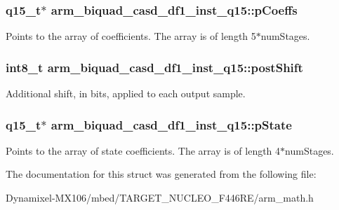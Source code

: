 \subsubsection[{\texorpdfstring{p\+Coeffs}{pCoeffs}}]{\setlength{\rightskip}{0pt plus 5cm}q15\+\_\+t$\ast$ arm\+\_\+biquad\+\_\+casd\+\_\+df1\+\_\+inst\+\_\+q15\+::p\+Coeffs}\hypertarget{structarm__biquad__casd__df1__inst__q15_a1edaacdebb5b09d7635bf20c779855fc}{}\label{structarm__biquad__casd__df1__inst__q15_a1edaacdebb5b09d7635bf20c779855fc}
Points to the array of coefficients. The array is of length 5$\ast$num\+Stages. 
\subsubsection[{\texorpdfstring{post\+Shift}{postShift}}]{\setlength{\rightskip}{0pt plus 5cm}int8\+\_\+t arm\+\_\+biquad\+\_\+casd\+\_\+df1\+\_\+inst\+\_\+q15\+::post\+Shift}\hypertarget{structarm__biquad__casd__df1__inst__q15_ada7e9d6269e6ed4eacf8f68729e9832d}{}\label{structarm__biquad__casd__df1__inst__q15_ada7e9d6269e6ed4eacf8f68729e9832d}
Additional shift, in bits, applied to each output sample. 
\subsubsection[{\texorpdfstring{p\+State}{pState}}]{\setlength{\rightskip}{0pt plus 5cm}q15\+\_\+t$\ast$ arm\+\_\+biquad\+\_\+casd\+\_\+df1\+\_\+inst\+\_\+q15\+::p\+State}\hypertarget{structarm__biquad__casd__df1__inst__q15_a5481104ef2f8f81360b80b47d69ae932}{}\label{structarm__biquad__casd__df1__inst__q15_a5481104ef2f8f81360b80b47d69ae932}
Points to the array of state coefficients. The array is of length 4$\ast$num\+Stages. 

The documentation for this struct was generated from the following file\+:\begin{DoxyCompactItemize}
\item 
Dynamixel-\/\+M\+X106/mbed/\+T\+A\+R\+G\+E\+T\+\_\+\+N\+U\+C\+L\+E\+O\+\_\+\+F446\+R\+E/arm\+\_\+math.\+h\end{DoxyCompactItemize}
